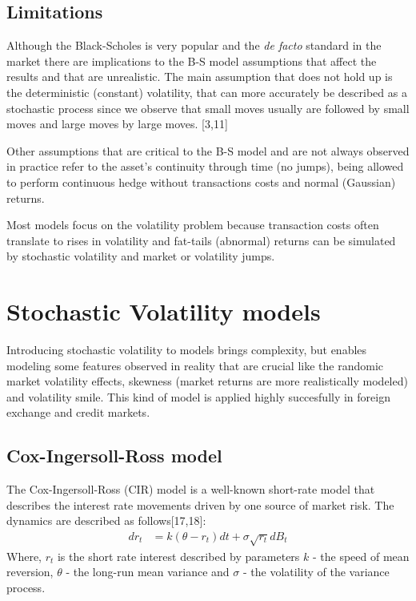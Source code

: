 \documentclass[12pt,twoside]{reedthesis}
\theoremstyle{definition}
\theoremstyle{definition}
\theoremstyle{remark}
\begin{document}
  \subsection{Limitations}\label{limitations}
  
  Although the Black-Scholes is very popular and the \emph{de facto}
  standard in the market there are implications to the B-S model
  assumptions that affect the results and that are unrealistic. The main
  assumption that does not hold up is the deterministic (constant)
  volatility, that can more accurately be described as a stochastic
  process since we observe that small moves usually are followed by small
  moves and large moves by large moves. {[}3,11{]}
  
  Other assumptions that are critical to the B-S model and are not always
  observed in practice refer to the asset's continuity through time (no
  jumps), being allowed to perform continuous hedge without transactions
  costs and normal (Gaussian) returns.
  
  Most models focus on the volatility problem because transaction costs
  often translate to rises in volatility and fat-tails (abnormal) returns
  can be simulated by stochastic volatility and market or volatility
  jumps.
  
  \section{Stochastic Volatility
  models}\label{stochastic-volatility-models}
  
  Introducing stochastic volatility to models brings complexity, but
  enables modeling some features observed in reality that are crucial like
  the randomic market volatility effects, skewness (market returns are
  more realistically modeled) and volatility smile. This kind of model is
  applied highly succesfully in foreign exchange and credit markets.
  
  \subsection{Cox-Ingersoll-Ross model}\label{cir}
  
  The Cox-Ingersoll-Ross (CIR) model is a well-known short-rate model that
  describes the interest rate movements driven by one source of market
  risk. The dynamics are described as follows{[}17,18{]}:
  \begin{align}
  \label{eq:cir}
  dr_t &= k(\theta - r_t)dt + \sigma \sqrt{r_t} dB_t
  \end{align}
  \noindent
  Where, \(r_t\) is the short rate interest described by parameters \(k\)
  - the speed of mean reversion, \(\theta\) - the long-run mean variance
  and \(\sigma\) - the volatility of the variance process.
  
\end{document}
